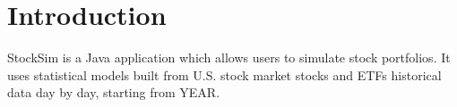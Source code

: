 \chapter{Introduction}
{\Large StockSim} is a Java application which allows users to simulate stock portfolios.
It uses statistical models built from U.S. stock market stocks and ETFs historical data day by day, starting from YEAR.
